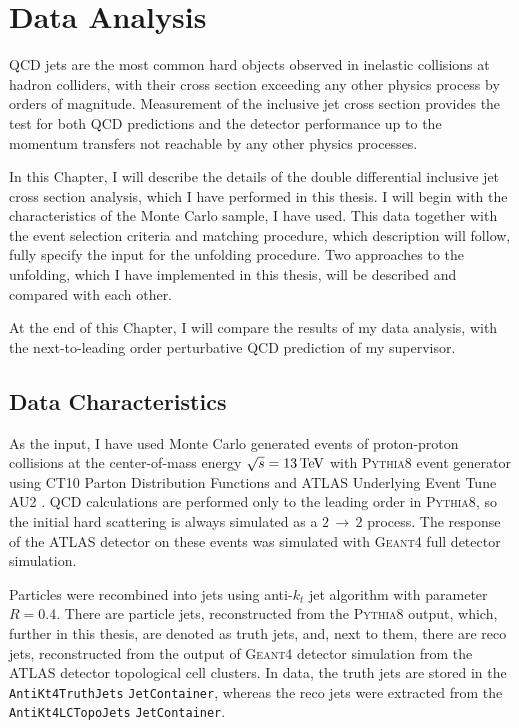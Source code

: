 \chapter{Data Analysis}


QCD jets are the most common hard objects observed in inelastic collisions 
at hadron colliders, with their cross section exceeding any other
physics process by orders of magnitude.  Measurement of the inclusive jet cross
section provides the test for both QCD predictions and the detector
performance up to the momentum transfers not reachable by any other physics
processes. 

In this Chapter, I will describe the details of the double differential
inclusive jet cross section analysis, which I have performed in this thesis.
I will begin with the characteristics of the Monte Carlo sample, I have used.
This data together with the event selection criteria and matching procedure,
which description will follow, fully specify the input for the unfolding
procedure. Two approaches to the unfolding, which I have implemented in this
thesis, will be described and compared with each other. 

At the end of this Chapter, I will compare the results of my data analysis, with
the next-to-leading order perturbative QCD prediction of my supervisor. 

\section{Data Characteristics}

As the input, I have used Monte Carlo generated events of proton-proton collisions at
the center-of-mass energy $\sqrt{s} = 13\,\text{TeV}$ with \textsc{Pythia8}
\cite{Pythia8} event generator using CT10 Parton Distribution Functions
\cite{CT10PDF} and ATLAS Underlying Event Tune AU2 \cite{AU2}. QCD calculations
are performed only to the leading order in \textsc{Pythia8}, so the initial hard
scattering is always simulated as a $2\,\rightarrow\,2$ process. The response of
the ATLAS detector on these events was simulated with \textsc{Geant4}
\cite{Geant4} full detector simulation.

Particles were recombined into jets using anti-$k_t$ jet algorithm with
parameter $R=0.4$. There are particle jets, reconstructed from the
\textsc{Pythia8} output, which, further in this thesis, are denoted as truth jets,
and, next to them, there are reco jets, reconstructed from the output of
\textsc{Geant4} detector simulation from the ATLAS detector topological cell
clusters. In data, the truth jets are stored in the \texttt{AntiKt4TruthJets}
\texttt{JetContainer}, whereas the reco jets were extracted from the \texttt{AntiKt4LCTopoJets}
\texttt{JetContainer}.

